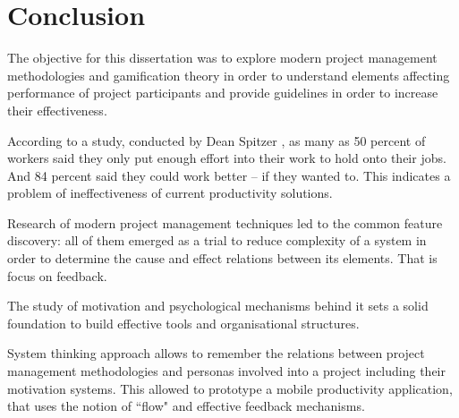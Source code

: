 \chapter*{Conclusion}

The objective for this dissertation was to explore modern project management methodologies and gamification theory in order to understand elements affecting performance of project participants and provide guidelines in order to increase their effectiveness.

According to a study, conducted by Dean Spitzer \cite{spitzer}, as many as 50 percent of workers said they only put enough effort into their work to hold onto their jobs. And 84 percent said they could work better -- if they wanted to. This indicates a problem of ineffectiveness of current productivity solutions.

Research of modern project management techniques led to the common feature discovery: all of them emerged as a trial to reduce complexity of a system in order to determine the cause and effect relations between its elements. That is focus on feedback.

The study of motivation and psychological mechanisms behind it sets a solid foundation to build effective tools and organisational structures.

System thinking approach allows to remember the relations between project management methodologies and personas involved into a project including their motivation systems. This allowed to prototype a mobile productivity application, that uses the notion of ``flow" and effective feedback mechanisms.  